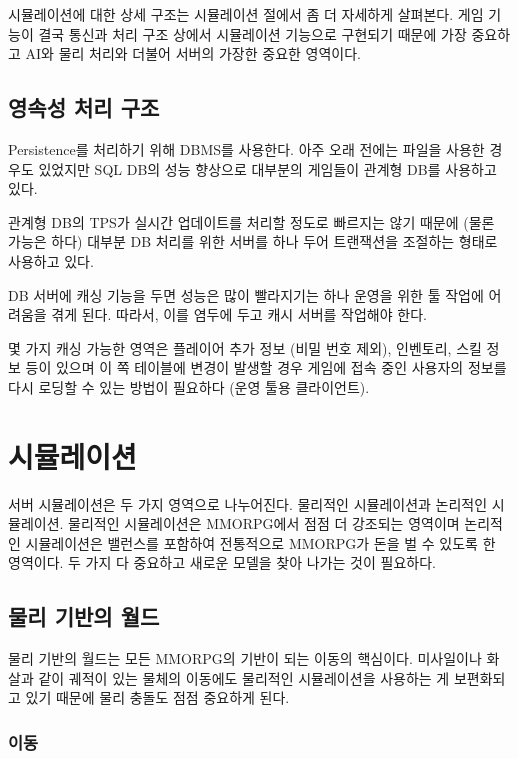 \documentclass[chapter,kosection, 10.5pt, romanfixed, a4paper]{oblivoir}
\begin{document}
시뮬레이션에 대한 상세 구조는 시뮬레이션 절에서 좀 더 자세하게 살펴본다. 게임 기능이 
결국 통신과 처리 구조 상에서 시뮬레이션 기능으로 구현되기 때문에 가장 중요하고 AI와 
물리 처리와 더불어 서버의 가장한 중요한 영역이다. 

\subsection{영속성 처리 구조}

Persistence를 처리하기 위해 DBMS를 사용한다. 아주 오래 전에는 파일을 사용한 경우도 있었지만
SQL DB의 성능 향상으로 대부분의 게임들이 관계형 DB를 사용하고 있다. 

관계형 DB의 TPS가 실시간 업데이트를 처리할 정도로 빠르지는 않기 때문에 (물론 가능은 하다)
대부분 DB 처리를 위한 서버를 하나 두어 트랜잭션을 조절하는 형태로 사용하고 있다. 

DB 서버에 캐싱 기능을 두면 성능은 많이 빨라지기는 하나 운영을 위한 툴 작업에 어려움을 
겪게 된다. 따라서, 이를 염두에 두고 캐시 서버를 작업해야 한다. 

몇 가지 캐싱 가능한 영역은 플레이어 추가 정보 (비밀 번호 제외), 인벤토리, 스킬 정보 등이 
있으며 이 쪽 테이블에 변경이 발생할 경우 게임에 접속 중인 사용자의 정보를 다시 로딩할 수 있는
방법이 필요하다 (운영 툴용 클라이언트).


\section{시뮬레이션}

서버 시뮬레이션은 두 가지 영역으로 나누어진다. 물리적인 시뮬레이션과 논리적인 시뮬레이션. 
물리적인 시뮬레이션은 MMORPG에서 점점 더 강조되는 영역이며 논리적인 시뮬레이션은 밸런스를
포함하여 전통적으로 MMORPG가 돈을 벌 수 있도록 한 영역이다. 두 가지 다 중요하고 새로운 모델을
찾아 나가는 것이 필요하다. 

\subsection{물리 기반의 월드}

물리 기반의 월드는 모든 MMORPG의 기반이 되는 이동의 핵심이다. 미사일이나 화살과 같이 
궤적이 있는 물체의 이동에도 물리적인 시뮬레이션을 사용하는 게 보편화되고 있기 때문에 
물리 충돌도 점점 중요하게 된다. 

\subsubsection{이동}
\end{document}
